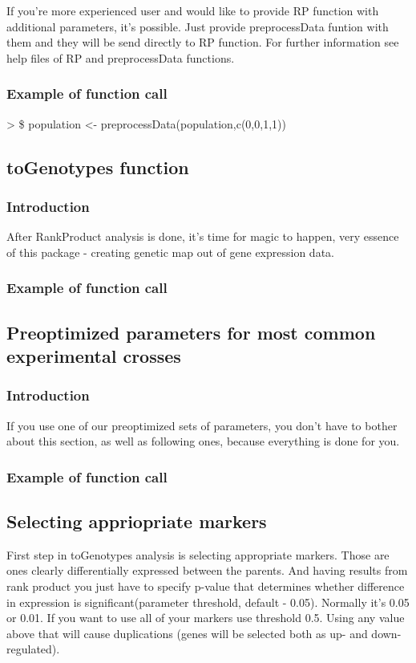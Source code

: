 \documentclass{article}
\begin{document}
{\noindent}If you're more experienced user and would like to provide RP function with additional parameters, it's possible. Just provide preprocessData funtion with them and they will be send directly to RP function. For further information see help files of RP and preprocessData functions.
\subsubsection{Example of function call}
>  \$ population <- preprocessData(population,c(0,0,1,1))
\subsection{toGenotypes function}
\subsubsection{Introduction}
After RankProduct analysis is done, it's time for magic to happen,  very essence of this package - creating genetic map out of gene expression data.
\subsubsection{Example of function call}
\subsection{Preoptimized parameters for most common experimental crosses}
\subsubsection{Introduction}
If you use one of our preoptimized sets of parameters, you don't have to bother about this section, as well as following ones, because everything is done for you. 
\subsubsection{Example of function call}
\subsection{Selecting appriopriate markers}
First step in toGenotypes analysis is selecting appropriate markers. Those are ones clearly differentially expressed between the parents. And having results from rank product you just have to specify p-value that determines whether difference in expression is significant(parameter threshold, default - 0.05). Normally it's 0.05 or 0.01. If you want to use all of your markers use threshold 0.5. Using any value above that will cause duplications (genes will be selected both as up- and down-regulated).
\end{document}
